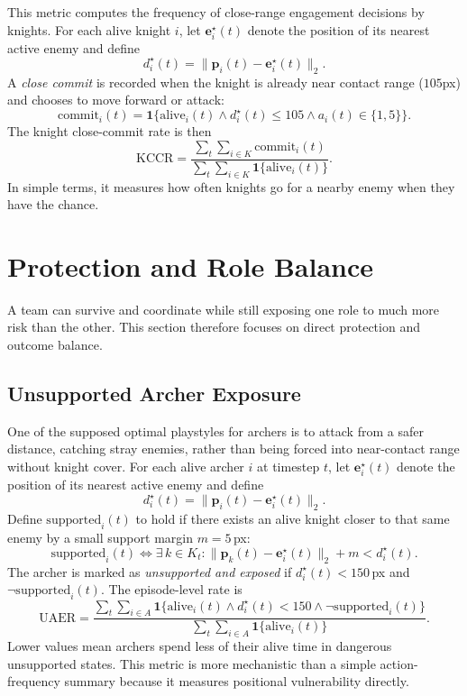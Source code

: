 This metric computes the frequency of close-range engagement decisions by knights. For each alive knight $i$, let $\mathbf{e}_i^\star(t)$ denote the position of its nearest active enemy and define
\[
d_i^\star(t)=\|\mathbf{p}_i(t)-\mathbf{e}_i^\star(t)\|_2.
\]
A \emph{close commit} is recorded when the knight is already near contact range ($105$px) and chooses to move forward or attack:
\[
\mathrm{commit}_i(t)=
\mathbf{1}\{\mathrm{alive}_i(t)\land d_i^\star(t)\le 105 \land a_i(t)\in\{1,5\}\}.
\]
The knight close-commit rate is then
\[
\mathrm{KCCR}=
\frac{\sum_t\sum_{i\in K}\mathrm{commit}_i(t)}
{\sum_t\sum_{i\in K}\mathbf{1}\{\mathrm{alive}_i(t)\}}.
\]
In simple terms, it measures how often knights go for a nearby enemy when they have the chance.

\section{Protection and Role Balance}

A team can survive and coordinate while still exposing one role to much more risk than the other. This section therefore focuses on direct protection and outcome balance.

\subsection{Unsupported Archer Exposure}
One of the supposed optimal playstyles for archers is to attack from a safer distance, catching stray enemies, rather than being forced into near-contact range without knight cover. For each alive archer $i$ at timestep $t$, let $\mathbf{e}_i^\star(t)$ denote the position of its nearest active enemy and define
\[
d_i^\star(t)=\|\mathbf{p}_i(t)-\mathbf{e}_i^\star(t)\|_2.
\]
Define $\mathrm{supported}_i(t)$ to hold if there exists an alive knight closer to that same enemy by a small support margin $m=5$\,px:
\[
\mathrm{supported}_i(t)\iff \exists\, k \in K_t :
\|\mathbf{p}_k(t)-\mathbf{e}_i^\star(t)\|_2 + m < d_i^\star(t).
\]
The archer is marked as \emph{unsupported and exposed} if $d_i^\star(t) < 150$\,px and $\neg \mathrm{supported}_i(t)$. The episode-level rate is
\[
\mathrm{UAER}=
\frac{\sum_t\sum_{i\in A}\mathbf{1}\{\mathrm{alive}_i(t)\land d_i^\star(t)<150 \land \neg \mathrm{supported}_i(t)\}}
{\sum_t\sum_{i\in A}\mathbf{1}\{\mathrm{alive}_i(t)\}}.
\]
Lower values mean archers spend less of their alive time in dangerous unsupported states. This metric is more mechanistic than a simple action-frequency summary because it measures positional vulnerability directly.

